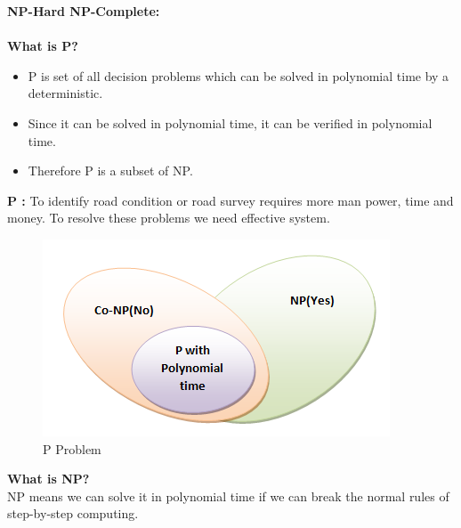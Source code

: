\documentclass[oneside,a4paper,12pt]{report}
\begin{document}
\\
\newpage
\begin{appendices}

\chapter{}

\textbf{NP-Hard NP-Complete:}\\
\vspace{1\baselineskip}\\
\textbf{What is P?}\\
\begin{itemize}
	\item P is set of all decision problems which can be solved in polynomial time by a deterministic.
	\item Since it can be solved in polynomial time, it can be verified in polynomial time.
	\item Therefore P is a subset of NP.
	
\end{itemize}

\textbf{P : } To identify road condition or road survey requires more man power, time and money. To resolve these problems we need effective system.

\begin{figure}[ht!]
	\centering
	\includegraphics[width=\linewidth]{p.png}
	\caption{P Problem}
	\label{fig:P Problem}
\end{figure}

\textbf{What is NP?}\\

NP means we can solve it in polynomial time if we can break the normal rules of step-by-step computing.
\vspace{1\baselineskip}


\end{appendices}
\end{document}
